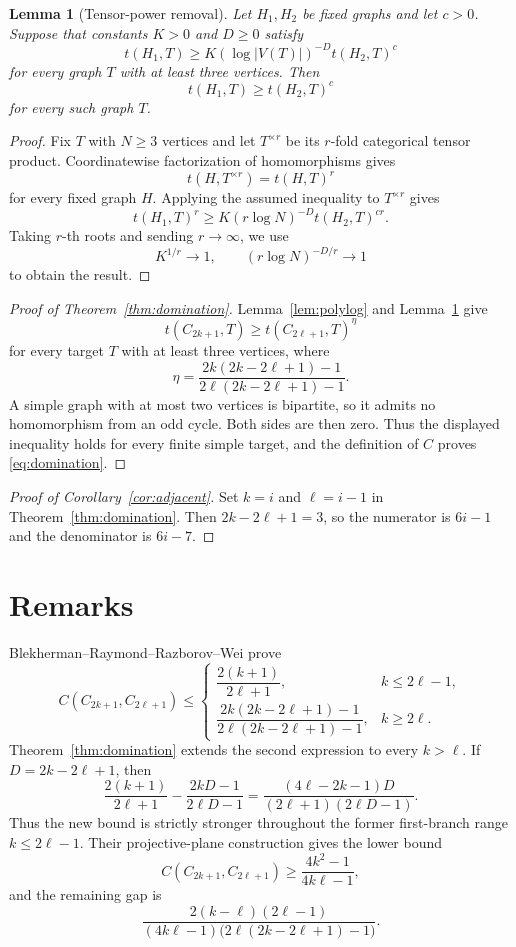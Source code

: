 \documentclass[11pt]{article}
\newtheorem{lemma}[theorem]{Lemma}
\theoremstyle{definition}
\theoremstyle{remark}
\begin{document}
\begin{lemma}[Tensor-power removal]
  \label{lem:tensor}
  Let $H_1,H_2$ be fixed graphs and let $c>0$.  Suppose that constants
  $K>0$ and $D\ge0$ satisfy
  \[
    t(H_1,T)\ge
    K(\log |V(T)|)^{-D}t(H_2,T)^c
  \]
  for every graph $T$ with at least three vertices.  Then
  \[
    t(H_1,T)\ge t(H_2,T)^c
  \]
  for every such graph $T$.
\end{lemma}

\begin{proof}
  Fix $T$ with $N\ge3$ vertices and let $T^{\times r}$ be its $r$-fold
  categorical tensor product.  Coordinatewise factorization of
  homomorphisms gives
  \[
    t(H,T^{\times r})=t(H,T)^r
  \]
  for every fixed graph $H$.  Applying the assumed inequality to
  $T^{\times r}$ gives
  \[
    t(H_1,T)^r
    \ge
    K(r\log N)^{-D}t(H_2,T)^{cr}.
  \]
  Taking $r$-th roots and sending $r\to\infty$, we use
  \[
    K^{1/r}\longrightarrow1,
    \qquad
    (r\log N)^{-D/r}\longrightarrow1
  \]
  to obtain the result.
\end{proof}

\begin{proof}[Proof of Theorem~\ref{thm:domination}]
  Lemma~\ref{lem:polylog} and Lemma~\ref{lem:tensor} give
  \[
    t(C_{2k+1},T)\ge t(C_{2\ell+1},T)^\eta
  \]
  for every target $T$ with at least three vertices, where
  \[
    \eta
    =
    \frac{2k(2k-2\ell+1)-1}
         {2\ell(2k-2\ell+1)-1}.
  \]
  A simple graph with at most two vertices is bipartite, so it admits
  no homomorphism from an odd cycle.  Both sides are then zero.
  Thus the displayed inequality holds for every finite simple target,
  and the definition of $C$ proves \eqref{eq:domination}.
\end{proof}

\begin{proof}[Proof of Corollary~\ref{cor:adjacent}]
  Set $k=i$ and $\ell=i-1$ in Theorem~\ref{thm:domination}.  Then
  $2k-2\ell+1=3$, so the numerator is $6i-1$ and the denominator is
  $6i-7$.
\end{proof}

\section{Remarks}

Blekherman--Raymond--Razborov--Wei prove
\[
  C(C_{2k+1},C_{2\ell+1})
  \le
  \begin{cases}
    \dfrac{2(k+1)}{2\ell+1},&k\le2\ell-1,\\[2mm]
    \dfrac{2k(2k-2\ell+1)-1}
          {2\ell(2k-2\ell+1)-1},&k\ge2\ell.
  \end{cases}
\]
Theorem~\ref{thm:domination} extends the second expression to every
$k>\ell$.  If $D=2k-2\ell+1$, then
\[
  \frac{2(k+1)}{2\ell+1}
  -
  \frac{2kD-1}{2\ell D-1}
  =
  \frac{(4\ell-2k-1)D}
       {(2\ell+1)(2\ell D-1)}.
\]
Thus the new bound is strictly stronger throughout the former
first-branch range $k\le2\ell-1$.  Their projective-plane construction
gives the lower bound
\[
  C(C_{2k+1},C_{2\ell+1})
  \ge\frac{4k^2-1}{4k\ell-1},
\]
and the remaining gap is
\[
  \frac{2(k-\ell)(2\ell-1)}
  {(4k\ell-1)\bigl(2\ell(2k-2\ell+1)-1\bigr)}.
\]
\end{document}
